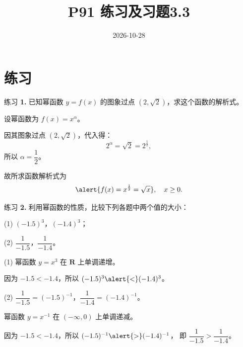 \documentclass[10pt,aspectratio=169,serif,fleqn]{beamer}
\title[习题3.3]{P91 练习及习题3.3 }
\subtitle{}
\author{}
\institute{}
\date{2026-10-28}
\begin{document}
\begin{frame}
  \titlepage
\end{frame}
\section{练习}
\begin{frame}[t]{练习 \textbf{1.} 已知幂函数 $y=f(x)$ 的图象过点 $(2,\sqrt{2})$，求这个函数的解析式。}
	
	\vspace{-2em}
		\begin{tcolorbox}[colback=orange!10,colframe=orange,title=\textbf{解}]
		设幂函数为 $f(x)=x^{\alpha}$。
		
		\vspace{0.3em}
		因其图象过点 $(2,\sqrt{2})$，代入得：
		\[
		2^{\alpha}=\sqrt{2}=2^{\frac12},
		\]
		所以 $\alpha=\dfrac12$。
		
		\vspace{0.5em}
		故所求函数解析式为
		\[
		\alert{f(x)=x^{\frac12}=\sqrt{x}},\quad x\ge 0.
		\]
	\end{tcolorbox}
\end{frame}



\begin{frame}[t]{练习 \textbf{2.} 利用幂函数的性质，比较下列各题中两个值的大小：}
	
	
	\vspace{-1em}
	(1) $(-1.5)^3$，$(-1.4)^3$；
	
	\vspace{0.5em}
	(2) $\dfrac{1}{-1.5}$，$\dfrac{1}{-1.4}$。
	
	
		\begin{tcolorbox}[colback=orange!10,colframe=orange,title=\textbf{解}]
		(1) 幂函数 $y=x^3$ 在 $\mathbf{R}$ 上单调递增。
		
		\vspace{0.3em}
		因为 $-1.5<-1.4$，所以 $(-1.5)^3\alert{<}(-1.4)^3$。
		
		\vspace{0.8em}
		(2) $\dfrac{1}{-1.5}=(-1.5)^{-1}$，$\dfrac{1}{-1.4}=(-1.4)^{-1}$。
		
		\vspace{0.3em}
		幂函数 $y=x^{-1}$ 在 $(-\infty,0)$ 上单调递减。
		
		\vspace{0.3em}
		因为 $-1.5<-1.4$，所以 $(-1.5)^{-1}\alert{>}(-1.4)^{-1}$，
		即 $\dfrac{1}{-1.5}>\dfrac{1}{-1.4}$。
	\end{tcolorbox}
\end{frame}
\end{document}

